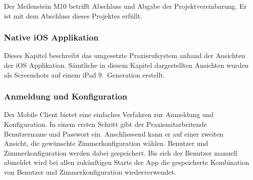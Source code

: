 Der Meilenstein M10 betrifft Abschluss und Abgabe der Projektvereinbarung.
Er ist mit dem Abschluss dieses Projektes erfüllt.

\subsubsection{Native iOS Applikation}

Dieses Kapitel beschreibt das umgesetzte Praxisrufsystem anhand der Ansichten der iOS Applikation.
Sämtliche in diesem Kapitel dargestellten Ansichten wurden als Screenshots auf einem iPad 9.\ Generation erstellt.

\subsubsection*{Anmeldung und Konfiguration}

Der Mobile Client bietet eine einfaches Verfahren zur Anmeldung und Konfiguration.
In einem ersten Schritt gibt der Praxismitarbeitende Benutzername und Passwort ein.
Anschliessend kann er auf einer zweiten Ansicht, die gewünschte Zimmerkonfiguration wählen.
Benutzer und Zimmerkonfiguration werden dabei gespeichert.
Bis sich der Benutzer manuell abmeldet wird bei allen zukünftigen Starts der App die gespeicherte Kombination von Benutzer und Zimmerkonfiguration wiederverwendet.

